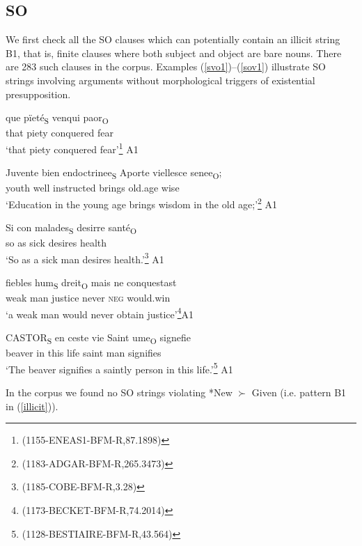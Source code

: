 \documentclass[output=paper,modfonts,nonflat]{langsci/langscibook}
\begin{document}
\subsection{SO}

We first check all the SO clauses which can potentially contain an illicit string B1, that is, finite clauses where both subject and object are bare nouns. There are 283 such clauses in the corpus. Examples (\ref{svo1})--(\ref{sov1}) illustrate SO strings involving arguments without morphological triggers of existential presupposition.%

\ea
\gll que p\"{i}et\'{e}\textsubscript{S} venqui paor\textsubscript{O}\\
that piety conquered fear\\
\glt `that piety conquered fear'\footnote{(1155-ENEAS1-BFM-R,87.1898)}\label{svo1} \hfill A1
\z

\ea
\gll Juvente bien endoctrinee\textsubscript{S} Aporte viellesce senee\textsubscript{O};\\
youth well instructed brings old.age wise\\
\glt `Education in the young age brings wisdom in the old age;'\footnote{{(1183-ADGAR-BFM-R,265.3473)}}\label{svo2} \hfill A1
\z

\ea
\gll Si con malades\textsubscript{S} desirre sant\'{e}\textsubscript{O} \\ %
so as sick desires health\\
\glt `So as a sick man desires health.'\footnote{{(1185-COBE-BFM-R,3.28)}}\label{svo3} \hfill A1
\z

\ea
\gll fiebles hum\textsubscript{S} dreit\textsubscript{O} mais ne conquestast\\
weak man justice never {\scshape neg} would.win\\
\glt `a weak man would never obtain justice'\footnote{{(1173-BECKET-BFM-R,74.2014)}}\hfill A1
\z

\ea
\gll CASTOR\textsubscript{S} en ceste vie Saint ume\textsubscript{O} signefie\\
beaver in this life saint man signifies\\
\glt `The beaver signifies a saintly person in this life.'\footnote{{(1128-BESTIAIRE-BFM-R,43.564)}} \label{sov1} \hfill A1
\z

In the corpus we found no SO strings violating *New $\succ$ Given (i.e. pattern B1 in (\ref{illicit})).
\end{document}
